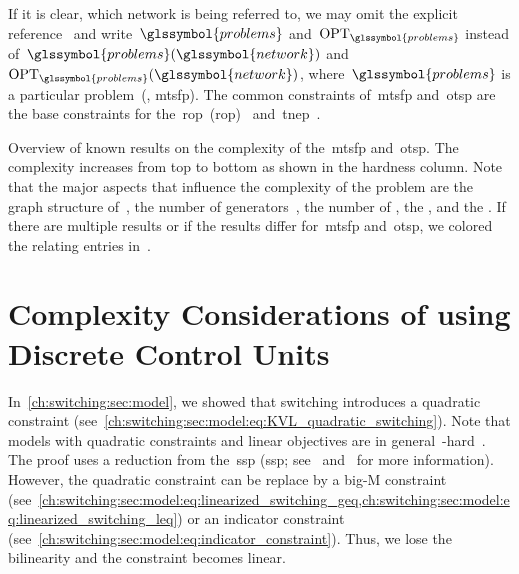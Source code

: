 % 
If it is clear, which network is being referred to, we may omit the explicit
reference~ and write~$\glssymbol{problems}$
and~$\opt_{\glssymbol{problems}}$ instead
of~$\glssymbol{problems}(\glssymbol{network})$
and~$\opt_{\glssymbol{problems}}(\glssymbol{network})$,
where~$\glssymbol{problems}$ is a particular problem~(\eg,
\gls{mtsfp}). The common constraints of~\gls{mtsfp} and~\gls{otsp} are the base
constraints for
the~\acrlong{rop}~(\gls{rop})~\parencite{van2011vehicle,COFFRIN2015144}
and~\gls{tnep}~\parencite{Hem13}.
% 
\begin{landscape}
    \begin{table}
        
        \vspace*{-2.0cm}
        \caption[Overview of results on the complexity of switching.]{Overview
        of known results on the complexity of the~\gls{mtsfp} and~\gls{otsp}.
        The complexity increases from top to bottom as shown in the hardness
        column. Note that the major aspects that influence the complexity of the
        problem are the graph structure of~, the number of
         {generators~}, the
        number of
        , the
        , and the
        . If there
        are multiple results or if the results differ for~\gls{mtsfp}
        and~\gls{otsp}, we colored the relating entries
        in~.}
        \label{ch:switching:sec:complexity:tbl:complexity-overview}
    \end{table}
\end{landscape}
% 
\section{Complexity Considerations of using Discrete Control Units}
\label{ch:switching:sec:complexity}
% 
In~\cref{ch:switching:sec:model}, we showed that switching introduces a
quadratic constraint
(see~\cref{ch:switching:sec:model:eq:KVL_quadratic_switching}). Note that models
with quadratic constraints and linear objectives are in
general~\NP-hard~\parencite[278]{Sah74}. The proof uses a reduction from
the~\acrlong{ssp} (\gls{ssp}; see~\textcite[p.245; MP2]{Gar79}
and~\textcite[p.447; MP5]{Aus99} for more information).
% 
However, the quadratic constraint can be replace by a big-M constraint
(see~\cref{ch:switching:sec:model:eq:linearized_switching_geq,ch:switching:sec:model:eq:linearized_switching_leq})
or an indicator constraint
(see~\cref{ch:switching:sec:model:eq:indicator_constraint}). Thus, we lose the
bilinearity and the constraint becomes linear.
% 
